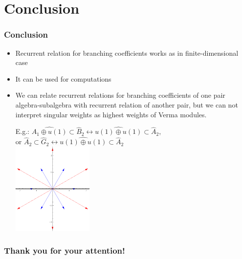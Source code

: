 \documentclass[pdftex]{beamer}
\theoremstyle{definition} \newtheorem{Def}{Definition}
\begin{document}
\section{Conclusion}
\begin{frame}
  \frametitle{Conclusion}
  \begin{itemize}
  \item Recurrent relation for branching coefficients works as in finite-dimensional case
  \item It can be used for computations 
  \item We can relate recurrent relations for branching coefficients of one pair algebra-subalgebra with recurrent relation of another pair, but we can not interpret singular weights as highest weights of Verma modules.\\
    \begin{multicols}{2}
      E.g.: $\widehat{A_{1}\oplus u(1)}\subset \hat B_{2} \longleftrightarrow \widehat{u(1)\oplus u(1)}\subset \hat A_{2}$, \\
      or $\hat A_{2} \subset \hat G_{2} \longleftrightarrow \widehat{u(1)\oplus u(1)}\subset \hat A_{2}$      \\
    \includegraphics[width=40mm]{figures/G2-color}
    \end{multicols}
  \end{itemize}
\end{frame}
\begin{frame}
  \frametitle{Thank you for your attention!}
\end{frame}
\end{document}
